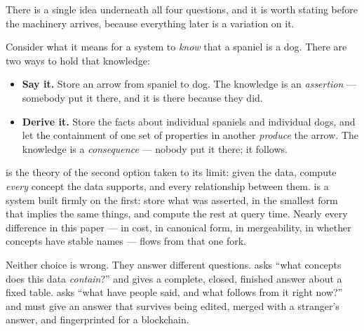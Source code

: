 There is a single idea underneath all four questions, and it is worth stating
before the machinery arrives, because everything later is a variation on it.

Consider what it means for a system to \emph{know} that a spaniel is a dog.
There are two ways to hold that knowledge:

\begin{itemize}[leftmargin=1.4em]
\item \textbf{Say it.} Store an arrow from \textsf{spaniel} to \textsf{dog}.
  The knowledge is an \emph{assertion} --- somebody put it there, and it is
  there because they did.
\item \textbf{Derive it.} Store the facts about individual spaniels and
  individual dogs, and let the containment of one set of properties in another
  \emph{produce} the arrow. The knowledge is a \emph{consequence} --- nobody
  put it there; it follows.
\end{itemize}

\fca{} is the theory of the second option taken to its limit: given the data,
compute \emph{every} concept the data supports, and every relationship between
them. \odag{} is a system built firmly on the first: store what was asserted,
in the smallest form that implies the same things, and compute the rest at
query time. Nearly every difference in this paper --- in cost, in canonical
form, in mergeability, in whether concepts have stable names --- flows from
that one fork.

Neither choice is wrong. They answer different questions. \fca{} asks ``what
concepts does this data \emph{contain}?'' and gives a complete, closed,
finished answer about a fixed table. \odag{} asks ``what have people said, and
what follows from it right now?'' and must give an answer that survives being
edited, merged with a stranger's answer, and fingerprinted for a blockchain.

